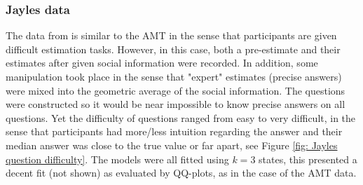 \documentclass[10pt,a4paper,twocolumn,lineno]{article}
\begin{document}
\subsubsection{Jayles data}
The data from \citep{jayles2017social} is similar to the AMT in the sense that participants are given difficult estimation tasks. However, in this case, both a pre-estimate and their estimates after given social information were recorded. In addition, some manipulation took place in the sense that "expert" estimates (precise answers) were mixed into the geometric average of the social information. The questions were constructed so it would be near impossible to know precise answers on all questions. Yet the difficulty of questions ranged from easy to very difficult, in the sense that participants had more/less intuition regarding the answer and their median answer was close to the true value or far apart, see Figure \ref{fig: Jayles question difficulty}. The models were all fitted using $k=3$ states, this presented a decent fit (not shown) as evaluated by QQ-plots, as in the case of the AMT data. 
\end{document}
